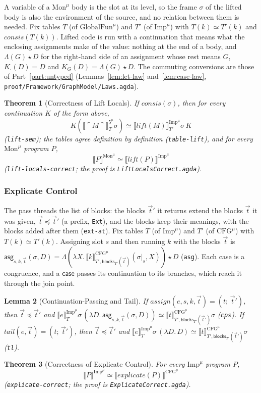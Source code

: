 \documentclass[10pt]{article}
\theoremstyle{acmplain}
\newtheorem{theorem}{Theorem}[section]
\newtheorem{lemma}[theorem]{Lemma}
\newcommand{\SEM}[1]{\llbracket #1 \rrbracket}
\newcommand{\key}[1]{\mathsf{#1}}
\newcommand{\pass}[1]{\mathit{#1}}
\newcommand{\app}{\star}
\newcommand{\consis}{\mathit{consis}}
\newcommand{\Tembed}[1]{\ulcorner #1 \urcorner}  %
\newcommand{\Tcut}[2]{#1|_{#2}}                %
\newcommand{\Ml}[1]{\textrm{#1}^{\mu}}                  %
\begin{document}
A variable of a $\Ml{Mon}$ body is the slot at its level, so the frame
$\sigma$ of the lifted body is also the environment of the source, and no
relation between them is needed. Fix tables $T$ (of $\Ml{GlobalFun}$) and $T'$
(of $\Ml{Imp}$) with $T(k) \simeq T'(k)$ and $\consis(T(k))$. Lifted code is
run with a continuation that means what the enclosing assignments make of
the value: nothing at the end of a body, and $\Lambda(G) \app D$ for the
right-hand side of an assignment whose rest means $G$,
$K_{\cdot}(D) = D$ and $K_G(D) = \Lambda(G) \app D$. The commuting
conversions are those of Part~\ref{part:untyped}
(Lemmas~\ref{lem:let-law} and~\ref{lem:case-law},
\texttt{proof/Framework/GraphModel/Laws.agda}).
\begin{theorem}[Correctness of Lift Locals]\label{thm:m-den-lift}
If $\consis(\sigma)$, then for every continuation $K$ of the form above,
\[ K(\SEM{\Tembed{M}}^{\Ml{5}}_{T}\sigma) \simeq \SEM{\pass{lift}(M)}^{\Ml{Imp}}_{T'}\sigma\,K \]
(\texttt{lift-sem}); the tables agree definition by definition
(\texttt{table-lift}), and for every $\Ml{Mon}$ program $P$,
\[ \SEM{P}^{\Ml{Mon}} \simeq \SEM{\pass{lift}(P)}^{\Ml{Imp}} \]
(\texttt{lift-locals-correct}; the proof is \texttt{LiftLocalsCorrect.agda}).
\end{theorem}

\subsubsection{Explicate Control}

The pass threads the list of blocks: the blocks $\vec{t}'$ it returns
extend the blocks $\vec{t}$ it was given, $\vec{t} \preceq \vec{t}'$ (a
prefix, \texttt{Ext}), and the blocks keep their meanings, with the
blocks added after them (\texttt{ext-at}). Fix tables $T$ (of $\Ml{Imp}$)
and $T'$ (of $\Ml{CFG}$) with $T(k) \simeq T'(k)$. Assigning slot $s$ and
then running $k$ with the blocks $\vec{t}$ is
$\key{asg}_{s,k,\vec{t}}(\sigma, D) = \Lambda(\lambda X.\,
\SEM{k}^{\Ml{CFG}}_{T',\key{blocks}_{T'}(\vec{t})}(\Tcut{\sigma}{s}, X)) \app D$
(\texttt{asg}). Each case is a congruence, and a $\key{case}$ passes its
continuation to its branches, which reach it through the join point.
\begin{lemma}[Continuation-Passing and Tail]\label{lem:m-den-cps}
If $\pass{assign}(e, s, k, \vec{t}) = (t;\, \vec{t}')$, then $\vec{t} \preceq \vec{t}'$ and
$\SEM{e}^{\Ml{Imp}}_{T}\sigma\,(\lambda D.\, \key{asg}_{s,k,\vec{t}}(\sigma, D)) \simeq
  \SEM{t}^{\Ml{CFG}}_{T',\key{blocks}_{T'}(\vec{t}')}\sigma$ (\texttt{cps}).
If $\pass{tail}(e, \vec{t}) = (t;\, \vec{t}')$, then $\vec{t} \preceq \vec{t}'$ and
$\SEM{e}^{\Ml{Imp}}_{T}\sigma\,(\lambda D.\, D) \simeq
  \SEM{t}^{\Ml{CFG}}_{T',\key{blocks}_{T'}(\vec{t}')}\sigma$ (\texttt{tl}).
\end{lemma}
\begin{theorem}[Correctness of Explicate Control]\label{thm:m-den-explicate}
For every $\Ml{Imp}$ program $P$,
\[ \SEM{P}^{\Ml{Imp}} \simeq \SEM{\pass{explicate}(P)}^{\Ml{CFG}} \]
(\texttt{explicate-correct}; the proof is \texttt{ExplicateCorrect.agda}).
\end{theorem}
\end{document}
